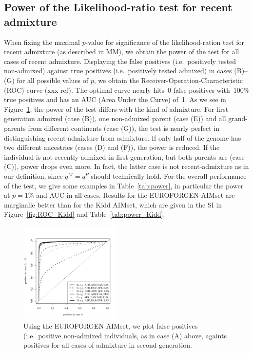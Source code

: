 \documentclass[12pt]{article}
\theoremstyle{definition}
\begin{document}
\subsection{Power of the Likelihood-ratio test for recent admixture}
When fixing the maximal $p$-value for significance of the
likelihood-ration test for recent admixture (as described in MM), we
obtain the power of the test for all cases of recent
admixture. Displaying the false positives (i.e.\ positively tested
non-admixed) against true positives (i.e.\ positively tested admixed)
in cases (B)--(G) for all possible values of $p$, we obtain the
Receiver-Operation-Characteristic (ROC) curve (xxx ref). The optimal
curve nearly hits~0 false positives with~100\% true positives and has
an AUC (Area Under the Curve) of~1. As we see in
Figure~\ref{fig:ROC_EUROFORGEN}, the power of the test differs with
the kind of admixture. For first generation admixed (case (B)), one
non-admixed parent (case (E)) and all grand-parents from different
continents (case (G)), the test is nearly perfect in distinguishing
recent-admixture from admixture. If only half of the genome has two
different ancestries (cases (D) and (F)), the power is reduced. If the
individual is not recently-admixed in first generation, but both
parents are (case (C)), power drops even more. In fact, the latter
case is not recent-admixture as in our definition, since $q^M = q^P$
should technically hold. For the overall performance of the test, we
give some examples in Table~\ref{tab:power}, in particular the power
at $p=1\%$ and AUC in all cases. Results for the EUROFORGEN AIMset are
marginalle better than for the Kidd AIMset, which are given in the SI
in Figure~\ref{fig:ROC_Kidd} and Table~\ref{tab:power_Kidd}.

\begin{figure}[htb]
  \begin{center}
    \includegraphics[width=0.45\textwidth]{roc-curve-EUROFORGENE.pdf}
  \end{center}
  \caption{Using the EUROFORGEN AIMset, we plot false positives (i.e.\
    positive non-admixed individuals, as in case (A) above, againts
    positives for all cases of admixture in second generation.}
  \label{fig:ROC_EUROFORGEN}
\end{figure}
\end{document}
